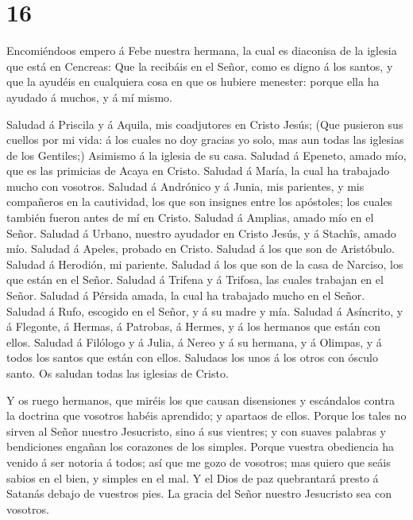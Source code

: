\hypertarget{section-15}{%
\section{16}\label{section-15}}

 Encomiéndoos empero á Febe nuestra hermana, la cual es
diaconisa de la iglesia que está en Cencreas:  Que la
recibáis en el Señor, como es digno á los santos, y que la ayudéis en
cualquiera cosa en que os hubiere menester: porque ella ha ayudado á
muchos, y á mí mismo.

 Saludad á Priscila y á Aquila, mis coadjutores en Cristo
Jesús;  (Que pusieron sus cuellos por mi vida: á los cuales
no doy gracias yo solo, mas aun todas las iglesias de los Gentiles;)
 Asimismo á la iglesia de su casa. Saludad á Epeneto, amado
mío, que es las primicias de Acaya en Cristo.  Saludad á
María, la cual ha trabajado mucho con vosotros.  Saludad á
Andrónico y á Junia, mis parientes, y mis compañeros en la cautividad,
los que son insignes entre los apóstoles; los cuales también fueron
antes de mí en Cristo.  Saludad á Amplias, amado mío en el
Señor.  Saludad á Urbano, nuestro ayudador en Cristo Jesús,
y á Stachîs, amado mío.  Saludad á Apeles, probado en
Cristo. Saludad á los que son de Aristóbulo.  Saludad á
Herodión, mi pariente. Saludad á los que son de la casa de Narciso, los
que están en el Señor.  Saludad á Trifena y á Trifosa, las
cuales trabajan en el Señor. Saludad á Pérsida amada, la cual ha
trabajado mucho en el Señor.  Saludad á Rufo, escogido en
el Señor, y á su madre y mía.  Saludad á Asíncrito, y á
Flegonte, á Hermas, á Patrobas, á Hermes, y á los hermanos que están con
ellos.  Saludad á Filólogo y á Julia, á Nereo y á su
hermana, y á Olimpas, y á todos los santos que están con ellos.
 Saludaos los unos á los otros con ósculo santo. Os saludan
todas las iglesias de Cristo.

 Y os ruego hermanos, que miréis los que causan disensiones
y escándalos contra la doctrina que vosotros habéis aprendido; y
apartaos de ellos.  Porque los tales no sirven al Señor
nuestro Jesucristo, sino á sus vientres; y con suaves palabras y
bendiciones engañan los corazones de los simples.  Porque
vuestra obediencia ha venido á ser notoria á todos; así que me gozo de
vosotros; mas quiero que seáis sabios en el bien, y simples en el mal.
 Y el Dios de paz quebrantará presto á Satanás debajo de
vuestros pies. La gracia del Señor nuestro Jesucristo sea con vosotros.

